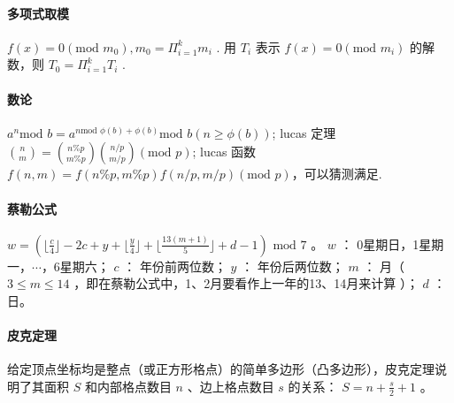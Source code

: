 \documentclass[landscape,a4paper]{article}
\begin{document}
\paragraph{多项式取模}
$f(x) = 0 (\text{mod }m_0), m_0 = \Pi_{i=1}^{k}m_i$ . 用 $T_i$ 表示 $f(x) = 0 (\text{mod }m_i)$ 的解数，则 $T_0 = \Pi_{i=1}^{k}T_i$ .

\paragraph{数论}
 $a^n \text{mod }b = a^{n \text{mod }\phi{(b)}+\phi{(b)}} \text{mod }b (n \geq \phi{(b)})$;
 lucas 定理 $\binom{n}{m} = \binom{n\%p}{m\%p}\binom{n/p}{m/p} (\text{mod }p)$;
 lucas 函数 $f(n, m) = f(n\%p,m\%p)f(n/p, m/p) (\text{mod }p)$，可以猜测满足.

\paragraph{蔡勒公式}
$w = (\lfloor \frac{c}{4} \rfloor - 2c + y + \lfloor \frac{y}{4} \rfloor + \lfloor \frac{13(m+1)}{5} \rfloor + d - 1) \text{ mod } 7$ 。
 $w$ ： 0星期日，1星期一，$\cdots$，6星期六；
 $c$ ： 年份前两位数；
 $y$ ： 年份后两位数；
 $m$ ： 月（ $3 \leq m \leq 14$ ，即在蔡勒公式中，1、2月要看作上一年的13、14月来计算 ）；
 $d$ ： 日。

\paragraph{皮克定理}
给定顶点坐标均是整点（或正方形格点）的简单多边形（凸多边形），皮克定理说明了其面积 $S$ 和内部格点数目 $n$ 、边上格点数目 $s$ 的关系： $S = n + \frac{s}{2} + 1$ 。
\end{document}
